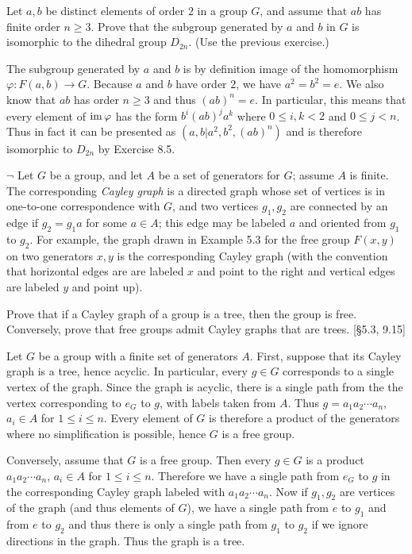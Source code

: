 \begin{problem}
	Let $a, b$ be distinct elements of order $2$ in a group $G$, and assume that $ab$ has finite order $n \geq 3$. Prove that the subgroup generated by $a$ and $b$ in $G$ is isomorphic to the dihedral group $D_{2n}$. (Use the previous exercise.)
\end{problem}

\begin{solution}
	The subgroup generated by $a$ and $b$ is by definition image of the homomorphism $\varphi: F({a, b}) \to G$. Because $a$ and $b$ have order $2$, we have $a^2 = b^2 = e$. We also know that $ab$ has order $n \geq 3$ and thus $(ab)^n = e$. In particular, this means that every element of $\operatorname{im} \varphi$ has the form $b^i (ab)^j a^k$ where $0 \leq i, k < 2$ and $0 \leq j < n$. Thus in fact it can be presented as $(a, b | a^2, b^2, (ab)^n)$ and is therefore isomorphic to $D_{2n}$ by Exercise 8.5.
\end{solution}

\begin{problem}
	$\neg$ Let $G$ be a group, and let $A$ be a set of generators for $G$; assume $A$ is finite. The corresponding \emph{Cayley graph} is a directed graph whose set of vertices is in one-to-one correspondence with $G$, and two vertices $g_1, g_2$ are connected by an edge if $g_2 = g_1a$ for some $a \in A$; this edge may be labeled $a$ and oriented from $g_1$ to $g_2$. For example, the graph drawn in Example 5.3 for the free group $F({x,y})$ on two generators $x, y$ is the corresponding Cayley graph (with the convention that horizontal edges are are labeled $x$ and point to the right and vertical edges are labeled $y$ and point up).
	
	Prove that if a Cayley graph of a group is a tree, then the group is free. Conversely, prove that free groups admit Cayley graphs that are trees. [\S5.3, 9.15]
\end{problem}

\begin{solution}
	Let $G$ be a group with a finite set of generators $A$. First, suppose that its Cayley graph is a tree, hence acyclic. In particular, every $g \in G$ corresponds to a single vertex of the graph. Since the graph is acyclic, there is a single path from the the vertex corresponding to $e_G$ to $g$, with labels taken from $A$. Thus $g = a_1 a_2 \cdots a_n$, $a_i \in A$ for $1 \leq i \leq n$. Every element of $G$ is therefore a product of the generators where no simplification is possible, hence $G$ is a free group.
	
	Conversely, assume that $G$ is a free group. Then every $g \in G$ is a product $a_1 a_2 \cdots a_n$, $a_i \in A$ for $1 \leq i \leq n$. Therefore we have a single path from $e_G$ to $g$ in the corresponding Cayley graph labeled with $a_1 a_2 \cdots a_n$. Now if $g_1, g_2$ are vertices of the graph (and thus elements of $G$), we have a single path from $e$ to $g_1$ and from $e$ to $g_2$ and thus there is only a single path from $g_1$ to $g_2$ if we ignore directions in the graph. Thus the graph is a tree.
\end{solution}	

